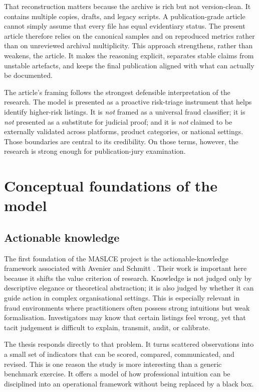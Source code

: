 \documentclass[11pt,a4paper]{article}
\begin{document}
That reconstruction matters because the archive is rich but not version-clean. It contains multiple copies, drafts, and legacy scripts. A publication-grade article cannot simply assume that every file has equal evidentiary status. The present article therefore relies on the canonical samples and on reproduced metrics rather than on unreviewed archival multiplicity. This approach strengthens, rather than weakens, the article. It makes the reasoning explicit, separates stable claims from unstable artefacts, and keeps the final publication aligned with what can actually be documented.

The article's framing follows the strongest defensible interpretation of the research. The model is presented as a proactive risk-triage instrument that helps identify higher-risk listings. It is \emph{not} framed as a universal fraud classifier; it is \emph{not} presented as a substitute for judicial proof; and it is \emph{not} claimed to be externally validated across platforms, product categories, or national settings. Those boundaries are central to its credibility. On those terms, however, the research is strong enough for publication-jury examination.

\section{Conceptual foundations of the model}
\subsection{Actionable knowledge}
The first foundation of the MASLCE project is the actionable-knowledge framework associated with Avenier and Schmitt \cite{avenier2007a,avenier2007b}. Their work is important here because it shifts the value criterion of research. Knowledge is not judged only by descriptive elegance or theoretical abstraction; it is also judged by whether it can guide action in complex organisational settings. This is especially relevant in fraud environments where practitioners often possess strong intuitions but weak formalisation. Investigators may know that certain listings feel wrong, yet that tacit judgement is difficult to explain, transmit, audit, or calibrate.

The thesis responds directly to that problem. It turns scattered observations into a small set of indicators that can be scored, compared, communicated, and revised. This is one reason the study is more interesting than a generic benchmark exercise. It offers a model of how professional intuition can be disciplined into an operational framework without being replaced by a black box.
\end{document}
